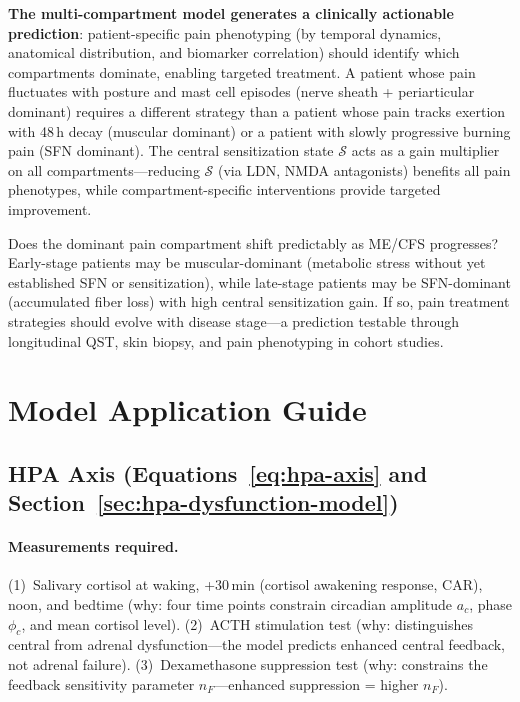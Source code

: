 \textbf{The multi-compartment model generates a clinically actionable prediction}: patient-specific pain phenotyping (by temporal dynamics, anatomical distribution, and biomarker correlation) should identify which compartments dominate, enabling targeted treatment. A patient whose pain fluctuates with posture and mast cell episodes (nerve sheath + periarticular dominant) requires a different strategy than a patient whose pain tracks exertion with 48\,h decay (muscular dominant) or a patient with slowly progressive burning pain (SFN dominant). The central sensitization state $\mathcal{S}$ acts as a gain multiplier on all compartments---reducing $\mathcal{S}$ (via LDN, NMDA antagonists) benefits all pain phenotypes, while compartment-specific interventions provide targeted improvement.

\begin{open_question}
Does the dominant pain compartment shift predictably as ME/CFS progresses? Early-stage patients may be muscular-dominant (metabolic stress without yet established SFN or sensitization), while late-stage patients may be SFN-dominant (accumulated fiber loss) with high central sensitization gain. If so, pain treatment strategies should evolve with disease stage---a prediction testable through longitudinal QST, skin biopsy, and pain phenotyping in cohort studies.
\end{open_question}

\section{Model Application Guide}
\label{sec:neuro-model-application}

\subsection{HPA Axis (Equations~\ref{eq:hpa-axis} and Section~\ref{sec:hpa-dysfunction-model})}

\paragraph{Measurements required.}
(1)~Salivary cortisol at waking, +30\,min (cortisol awakening response, CAR), noon, and bedtime (why: four time points constrain circadian amplitude $a_c$, phase $\phi_c$, and mean cortisol level).
(2)~ACTH stimulation test (why: distinguishes central from adrenal dysfunction---the model predicts enhanced central feedback, not adrenal failure).
(3)~Dexamethasone suppression test (why: constrains the feedback sensitivity parameter $n_F$---enhanced suppression = higher $n_F$).

